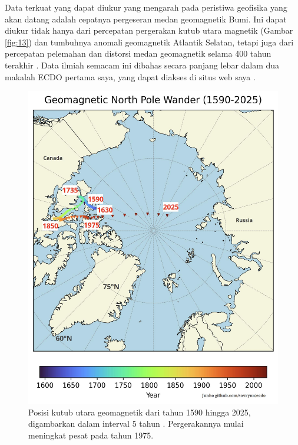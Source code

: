 \documentclass[10pt,twocolumn,letterpaper]{article}
\begin{document}
Data terkuat yang dapat diukur yang mengarah pada peristiwa geofisika yang akan datang adalah cepatnya pergeseran medan geomagnetik Bumi. Ini dapat diukur tidak hanya dari percepatan pergerakan kutub utara magnetik (Gambar \ref{fig:13}) dan tumbuhnya anomali geomagnetik Atlantik Selatan, tetapi juga dari percepatan pelemahan dan distorsi medan geomagnetik selama 400 tahun terakhir \cite{3}. Data ilmiah semacam ini dibahas secara panjang lebar dalam dua makalah ECDO pertama saya, yang dapat diakses di situs web saya \cite{3}.

\begin{figure}[t]
\begin{center}
   \includegraphics[width=1\linewidth]{npw.jpg}
\end{center}
   \caption{Posisi kutub utara geomagnetik dari tahun 1590 hingga 2025, digambarkan dalam interval 5 tahun \cite{41}. Pergerakannya mulai meningkat pesat pada tahun 1975.}
\label{fig:13}
\label{fig:onecol}
\end{figure}
\end{document}
